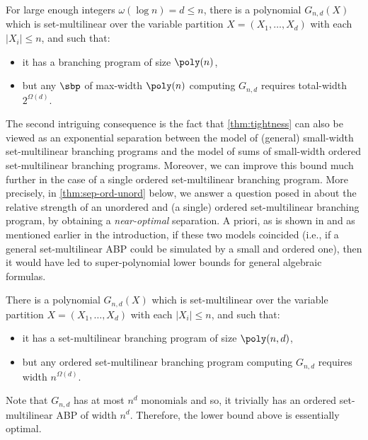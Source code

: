 \documentclass{article}
\begin{document}
\begin{theorem}\label{thm:tightness}
    For large enough integers $\omega(\log n) = d\leq n$, there is a polynomial $G_{n,d}(X)$ which is set-multilinear over the variable partition $X = (X_1,\ldots,X_d)$ with
each $|X_i| \leq n$, and such that:
\begin{itemize}
    \item it has a branching program of size $\poly(n)$,
    \item but any $\sbp$ of max-width $\poly(n)$ computing $G_{n,d}$ requires total-width $2^{\Omega(d)}$. 
\end{itemize}
\end{theorem}

The second intriguing consequence is the fact that \autoref{thm:tightness} can also be viewed as an exponential separation between the model of (general) small-width set-multilinear branching programs and the model of sums of small-width ordered set-multilinear branching programs. Moreover, we can improve this bound much further in the case of a single ordered set-multilinear branching program.
More precisely, in \autoref{thm:sep-ord-unord} below, we answer a question posed in \cite{KushS23} about the relative strength of an unordered and (a single) ordered set-multilinear branching program, by obtaining a \emph{near-optimal} separation. 
A priori, as is shown in \cite{KushS23} and as mentioned earlier in the introduction, if these two models coincided (i.e., if a general set-multilinear ABP could be simulated by a small and ordered one), then it would have led to super-polynomial lower bounds for general algebraic formulas. 

\begin{theorem}\label{thm:sep-ord-unord}
    There is a polynomial $G_{n,d}(X)$ which is set-multilinear over the variable partition $X = (X_1,\ldots,X_d)$ with
each $|X_i| \leq n$, and such that:
\begin{itemize}
    \item it has a set-multilinear branching program of size $\poly(n,d)$,
    \item but any ordered set-multilinear branching program computing $G_{n,d}$ requires width $n^{\Omega(d)}$. 
\end{itemize}
\end{theorem}

Note that $G_{n,d}$ has at most $n^{d}$ monomials and so, it trivially has an ordered set-multilinear ABP of width $n^{d}$. Therefore, the lower bound above is essentially optimal.
\end{document}
